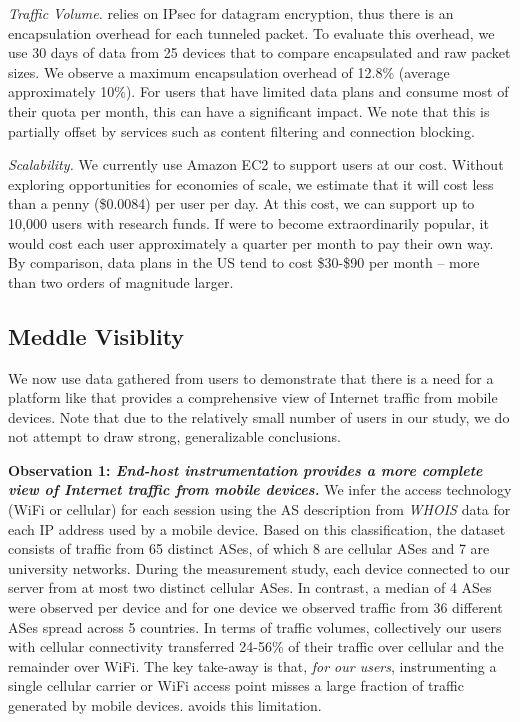 \noindent\emph{Traffic Volume.}
\meddle relies on IPsec for datagram encryption, thus there is an encapsulation overhead for each tunneled packet. 
To evaluate this overhead, we use 30 days of data from 25 devices that to compare encapsulated and raw packet sizes. 
We observe a maximum encapsulation overhead of 12.8\% (average approximately 10\%). 
For users that have limited data plans and consume most of their quota per month, this can have 
a significant impact. We note that this is partially offset by \meddle services such as content filtering and 
connection blocking. %

\noindent\emph{Scalability.} We currently use Amazon EC2 to support users at our cost. 
Without exploring opportunities for economies of scale, we estimate that 
it will cost less than a penny (\$0.0084) per user per day. At this cost, we can support up to 
10,000 users with research funds. If \meddle were to become extraordinarily popular, it would 
cost each user approximately a quarter per month to pay their own way. By comparison, 
data plans in the US tend to cost \$30-\$90 per month -- more than two orders of magnitude larger.

\subsection{Meddle Visiblity}


We now use data gathered from users to demonstrate that there is a need for a platform like \meddle that provides a comprehensive view of Internet traffic from mobile devices. 
Note that due to the relatively small number of users in our study, we do not attempt to  
draw strong, generalizable conclusions. 

\noindent\textbf{Observation 1: \emph{End-host instrumentation provides a more complete view of 
Internet traffic from mobile devices.}} We infer the access technology (WiFi or cellular) for 
each session using the AS description from \emph{WHOIS} data for each IP address used by a mobile device.
Based on this classification, the \mobWild dataset consists of traffic from 65 distinct ASes, of which 8 are cellular ASes and 7 are university networks.
During the measurement study, each device connected to our \platname server from at most two distinct cellular ASes. 
In contrast, a median of 4 \wifi ASes were observed per device and for one device we observed traffic from 36 different \wifi ASes spread across 5 countries.
In terms of traffic volumes, collectively our users with cellular connectivity transferred 24-56\% of their traffic over cellular 
and the remainder over WiFi. 
The key take-away is that, \emph{for our users}, instrumenting a single cellular carrier or WiFi access point misses a 
large fraction of traffic generated by mobile devices. \meddle avoids this limitation.

